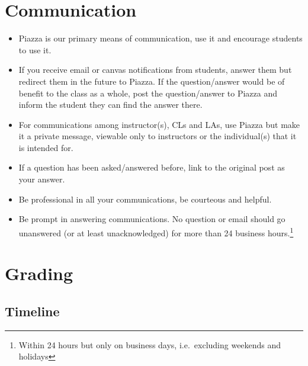 \documentclass[12pt]{scrartcl}
\begin{document}
\section*{Communication}

\begin{itemize}
  \item Piazza is our primary means of communication, use it and encourage 
students to use it.  
  \item If you receive email or canvas notifications from students, answer 
  them but redirect them in the future to Piazza.  If the question/answer
  would be of benefit to the class as a whole, post the question/answer
  to Piazza and inform the student they can find the answer there.
  \item For communications among instructor(s), CLs and LAs, use Piazza 
  but make it a private message, viewable only to instructors or the
  individual(s) that it is intended for.
  \item If a question has been asked/answered before, link to the original
  post as your answer.
  \item Be professional in all your communications, be courteous and
  helpful.  
  \item Be prompt in answering communications.  No question or email 
  should go unanswered (or at least unacknowledged) for more than 24 business hours.\footnote{Within 24 hours but only
  on business days, i.e.\ excluding weekends and holidays}
\end{itemize}

\section*{Grading}

\subsection*{Timeline}
\end{document}
